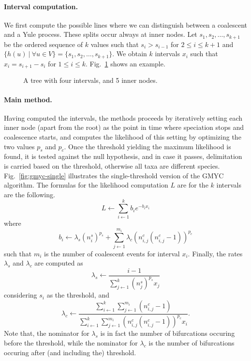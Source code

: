 \documentclass{llncs}
\begin{document}
\paragraph{\bf Interval computation.}
We first compute the possible lines where we can distinguish between a
coalescent and a Yule process. These splits occur always at inner nodes.  Let
$s_1, s_2, \ldots, s_{k+1}$ be the ordered sequence of $k$ values such that
$s_i> s_{i-1}$ for $2 \leq i \leq k+1$ and $\{ h(u) \ |\ \forall u \in V\} = \{
s_1, s_2, \ldots, s_{k+1}\}$.  We obtain $k$ intervals $x_i$ such that $x_i =
s_{i+1} - s_i$ for $1 \leq i \leq k$. Fig.~\ref{fig:tree} shows an example.

\begin{figure}[t]
\centering

\caption{A tree with four intervals, and 5 inner nodes.}\label{fig:tree}
\end{figure}

\paragraph{\bf Main method.}
Having computed the intervals, the methods proceeds by iteratively setting each
inner node (apart from the root) as the point in time where speciation stops
and coalescence starts, and computes the likelihood of this setting by
optimizing the two values $p_s$ and $p_c$. Once the threshold yielding the
maximum likelihood is found, it is tested against the null hypothesis, and in
case it passes, delimitation is carried based on the threshold, otherwise all
taxa are different species. Fig.~\ref{fig:gmyc-single} illustrates the
single-threshold version of the GMYC algorithm.  The formulas for the
likelihood computation $L$ are for the $k$ intervals are the following.
$$L \leftarrow \sum_{i\leftarrow 1}^k b_i e^{-b_i x_i}$$
where
$$b_i \leftarrow \lambda_s (n_i^s)^{p_s} + \sum_{j\leftarrow 1}^{m_i}\lambda_c(n_{i,j}^c(n_{i,j}^c-1))^{p_c}$$
such that $m_i$ is the number of coalescent events for interval $x_i$. Finally, the rates $\lambda_s$ and $\lambda_c$
are computed as
$$ \lambda_s \leftarrow \frac{i-1}{\sum_{j\leftarrow 1}^k (n_j^s)^{p_s} x_j}$$
considering $s_i$ as the threshold, and
$$ \lambda_c \leftarrow \frac{\sum_{i\leftarrow 1}^k\sum_{j\leftarrow 1}^{m_i}(n_{i,j}^c-1)}{\sum_{i\leftarrow 1}^k\sum_{j\leftarrow 1}^{m_i}(n_{i,j}^c(n_{i,j}^c -1))^{p_c}x_i}.$$
Note that, the nominator for $\lambda_s$ is in fact the number of bifurcations
occuring before the threshold, while the nominator for $\lambda_c$ is the
number of bifurcations occuring after (and including the) threshold.
\end{document}
